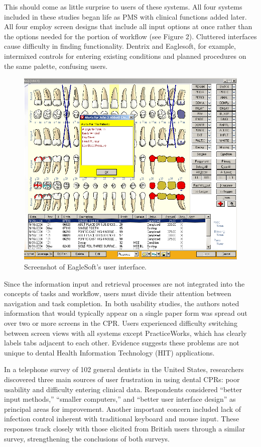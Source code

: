 \documentclass[11pt]{article}
\begin{document}
This should come as little surprise to users of these systems. All four systems included in these studies began life as PMS with clinical functions added later. All four employ screen designs that include all input options at once rather than the options needed for the portion of workflow (see Figure 2). Cluttered interfaces cause difficulty in finding functionality. Dentrix and Eaglesoft, for example, intermixed controls for entering existing conditions and planned procedures on the same palette, confusing users.
\label{fig:2}
\begin{figure}[h!tb]
\begin{center}
\includegraphics[width=360pt]{ss1es.png}
\end{center}
\caption{Screenshot of EagleSoft's user interface.}
\end{figure}Since the information input and retrieval processes are not integrated into the concepts of tasks and workflow, users must divide their attention between navigation and task completion. In both usability studies, the authors noted information that would typically appear on a single paper form was spread out over two or more screens in the CPR. Users experienced difficulty switching between screen views with all systems except PracticeWorks, which has clearly labels tabs adjacent to each other. Evidence suggests these problems are not unique to dental Health Information Technology (HIT) applications.\cite{Ash2004Some-unintended,Rose2005Using-qualitati}

In a telephone survey of 102 general dentists in the United States, researchers discovered three main sources of user frustration in using dental CPRs: poor usability and difficulty entering clinical data.\cite{Schleyer2006Clinical-Comput} Respondents considered ``better input methods,'' ``smaller computers,'' and ``better user interface design'' as principal areas for improvement. Another important concern included lack of infection control inherent with traditional keyboard and mouse input. These responses track closely with those elicited from British users through a similar survey, strengthening the conclusions of both surveys.\cite{John2003Questionnaire-s}
\end{document}
